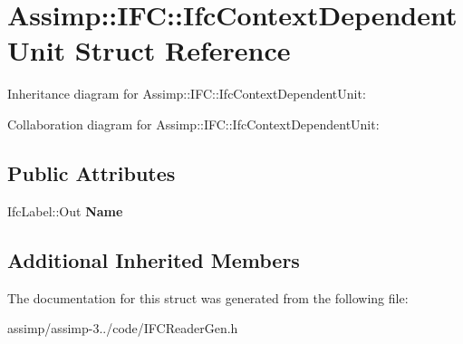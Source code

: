 \hypertarget{struct_assimp_1_1_i_f_c_1_1_ifc_context_dependent_unit}{\section{Assimp\+:\+:I\+F\+C\+:\+:Ifc\+Context\+Dependent\+Unit Struct Reference}
\label{struct_assimp_1_1_i_f_c_1_1_ifc_context_dependent_unit}
}


Inheritance diagram for Assimp\+:\+:I\+F\+C\+:\+:Ifc\+Context\+Dependent\+Unit\+:


Collaboration diagram for Assimp\+:\+:I\+F\+C\+:\+:Ifc\+Context\+Dependent\+Unit\+:
\subsection*{Public Attributes}
\begin{DoxyCompactItemize}
\item 
\hypertarget{struct_assimp_1_1_i_f_c_1_1_ifc_context_dependent_unit_a552637e8e73751a860b2f3bf9e30c7cf}{Ifc\+Label\+::\+Out {\bfseries Name}}\label{struct_assimp_1_1_i_f_c_1_1_ifc_context_dependent_unit_a552637e8e73751a860b2f3bf9e30c7cf}

\end{DoxyCompactItemize}
\subsection*{Additional Inherited Members}


The documentation for this struct was generated from the following file\+:\begin{DoxyCompactItemize}
\item 
assimp/assimp-\/3../code/I\+F\+C\+Reader\+Gen.\+h\end{DoxyCompactItemize}
